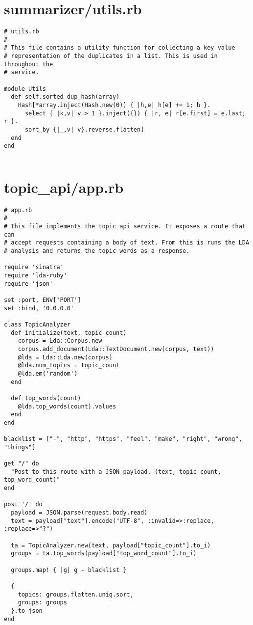 \documentclass{article}
\begin{document}
\section*{summarizer/utils.rb}
\begin{verbatim}
# utils.rb
#
# This file contains a utility function for collecting a key value
# representation of the duplicates in a list. This is used in throughout the
# service.

module Utils
  def self.sorted_dup_hash(array)
    Hash[*array.inject(Hash.new(0)) { |h,e| h[e] += 1; h }.
      select { |k,v| v > 1 }.inject({}) { |r, e| r[e.first] = e.last; r }.
      sort_by {|_,v| v}.reverse.flatten]
  end
end


\end{verbatim}
\pagebreak

\section*{topic\_api/app.rb}
\begin{verbatim}
# app.rb
#
# This file implements the topic api service. It exposes a route that can
# accept requests containing a body of text. From this is runs the LDA
# analysis and returns the topic words as a response.

require 'sinatra'
require 'lda-ruby'
require 'json'

set :port, ENV['PORT']
set :bind, '0.0.0.0'

class TopicAnalyzer
  def initialize(text, topic_count)
    corpus = Lda::Corpus.new
    corpus.add_document(Lda::TextDocument.new(corpus, text))
    @lda = Lda::Lda.new(corpus)
    @lda.num_topics = topic_count
    @lda.em('random')
  end

  def top_words(count)
    @lda.top_words(count).values
  end
end

blacklist = ["-", "http", "https", "feel", "make", "right", "wrong", "things"]

get "/" do
  "Post to this route with a JSON payload. (text, topic_count, top_word_count)"
end

post '/' do
  payload = JSON.parse(request.body.read)
  text = payload["text"].encode("UTF-8", :invalid=>:replace, :replace=>"?")

  ta = TopicAnalyzer.new(text, payload["topic_count"].to_i)
  groups = ta.top_words(payload["top_word_count"].to_i)

  groups.map! { |g| g - blacklist }

  {
    topics: groups.flatten.uniq.sort,
    groups: groups
  }.to_json
end


\end{verbatim}
\pagebreak
\end{document}
